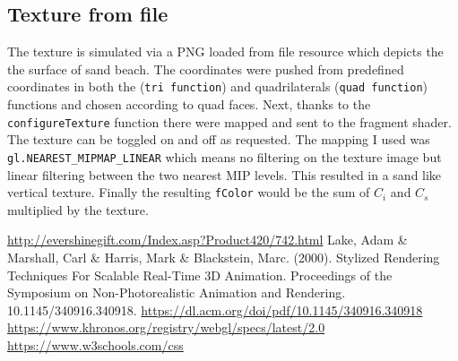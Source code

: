 \documentclass[12pt,a4paper]{article}
\begin{document}
\subsection{Texture from file}
The texture is simulated via a PNG loaded from file resource which depicts the the surface of sand beach. The coordinates were pushed from predefined coordinates in both the  (\texttt{tri function{}}) and quadrilaterals (\texttt{quad function{}}) functions and chosen according to quad faces. Next, thanks to the \texttt{configureTexture} function there were mapped and sent to the fragment shader. The texture can be toggled on and off as requested. The mapping I used was \texttt{gl.NEAREST\_MIPMAP\_LINEAR} which means no filtering on the texture image but linear filtering between the two nearest MIP levels. This resulted in a sand like vertical texture. Finally the resulting \texttt{fColor} would be the sum of $C_i$ and  $C_s$ multiplied by the texture.


\begin{thebibliography}{1}

   \url{http://evershinegift.com/Index.asp?Product420/742.html}
 Lake, Adam \& Marshall, Carl \& Harris, Mark \& Blackstein, Marc. (2000). Stylized Rendering Techniques For Scalable Real-Time 3D Animation. Proceedings of the Symposium on Non-Photorealistic Animation and Rendering. 10.1145/340916.340918.  \url{https://dl.acm.org/doi/pdf/10.1145/340916.340918}
 \url{https://www.khronos.org/registry/webgl/specs/latest/2.0}
 \url{https://www.w3schools.com/css}

\end{thebibliography}
\end{document}
